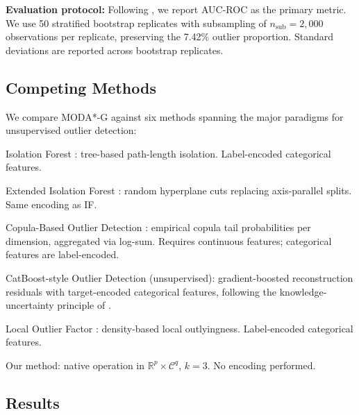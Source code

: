 \documentclass[11pt]{article}
\theoremstyle{plain}
\theoremstyle{definition}
\newcommand{\R}{\mathbb{R}}
\newcommand{\C}{\mathcal{C}}
\begin{document}
\textbf{Evaluation protocol:} Following
\citet{campos2016}, we report AUC-ROC as the primary
metric. We use 50 stratified bootstrap replicates
with subsampling of $n_\text{sub} = 2{,}000$
observations per replicate, preserving the 7.42\%
outlier proportion. Standard deviations are reported
across bootstrap replicates.

\subsection{Competing Methods}

We compare MODA*-G against six methods spanning the
major paradigms for unsupervised outlier detection:

\begin{description}[leftmargin=*]
\item[IF] Isolation Forest \citep{liu2008}: tree-based
  path-length isolation. Label-encoded categorical features.
\item[EIF] Extended Isolation Forest
  \citep{hariri2019}: random hyperplane cuts replacing
  axis-parallel splits. Same encoding as IF.
\item[COPOD] Copula-Based Outlier Detection
  \citep{li2020copod}: empirical copula tail probabilities
  per dimension, aggregated via log-sum. Requires
  continuous features; categorical features are
  label-encoded.
\item[CBOD] CatBoost-style Outlier Detection
  (unsupervised): gradient-boosted reconstruction
  residuals with target-encoded categorical features,
  following the knowledge-uncertainty principle of
  \citet{malinin2020}.
\item[LOF] Local Outlier Factor \citep{breunig2000}:
  density-based local outlyingness.
  Label-encoded categorical features.
\item[MODA*-G] Our method: native operation in
  $\R^p \times \C^q$, $k=3$. No encoding performed.
\end{description}

\subsection{Results}
\end{document}
